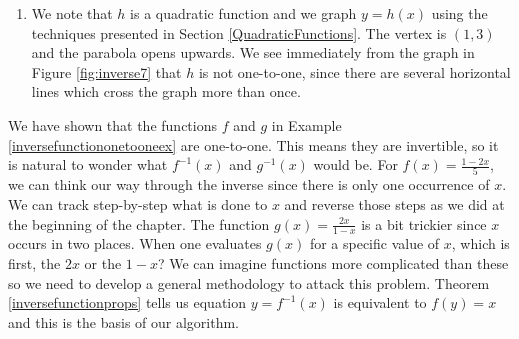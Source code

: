 {\begin{enumerate}
\begin{enumerate}
\[\begin{array}{rclr}
c = d & \mbox{or} & c = 2-d & \\

\end{array} \]

We get $c=d$ as one possibility, but we also get the possibility that $c=2-d$.  This suggests that $f$ may not be one-to-one.  Taking $d=0$, we get $c = 0$ or $c = 2$.  With $h(0) = 4$ and $h(2) = 4$, we have produced two different inputs with the same output meaning $h$ is not one-to-one.

\item  We note that $h$ is a quadratic function and we graph $y=h(x)$ using the techniques presented in Section \ref{QuadraticFunctions}.  The vertex is $(1,3)$ and the parabola opens upwards.  We see immediately from the graph in Figure \ref{fig:inverse7} that $h$ is not one-to-one, since there are several horizontal lines which cross the graph more than once.

\end{enumerate}



\end{enumerate}

}

\medskip

We have shown that the functions $f$ and $g$ in Example \ref{inversefunctiononetooneex} are one-to-one.  This means they are invertible, so it is natural to wonder what $f^{-1}(x)$ and $g^{-1}(x)$ would be.  For $f(x) =  \frac{1-2x}{5}$, we can think our way through the inverse since there is only one occurrence of $x$. We can track step-by-step what is done to $x$ and reverse those steps as we did at the beginning of the chapter.  The function $g(x) = \frac{2x}{1-x}$ is a bit trickier since $x$ occurs in two places.  When one evaluates $g(x)$ for a specific value of $x$, which is first, the $2x$ or the $1-x$?  We can imagine functions more complicated than these so we need to develop a general methodology to attack this problem.  Theorem \ref{inversefunctionprops} tells us equation $y = f^{-1}(x)$ is equivalent to $f(y) = x$ and this is the basis of our algorithm.

\smallskip


